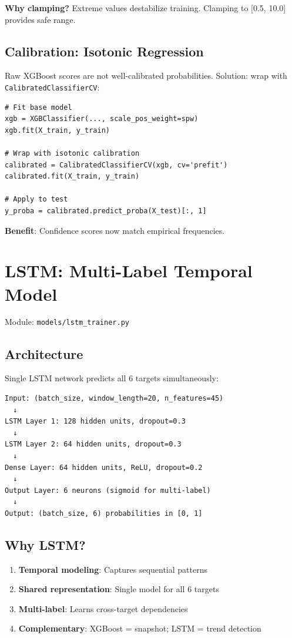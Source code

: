 \documentclass[11pt,a4paper,oneside]{report}
\begin{document}
\textbf{Why clamping?} Extreme values destabilize training. Clamping to [0.5, 10.0] provides safe range.

\subsection{Calibration: Isotonic Regression}

Raw XGBoost scores are not well-calibrated probabilities. Solution: wrap with \texttt{CalibratedClassifierCV}:

\begin{lstlisting}
# Fit base model
xgb = XGBClassifier(..., scale_pos_weight=spw)
xgb.fit(X_train, y_train)

# Wrap with isotonic calibration
calibrated = CalibratedClassifierCV(xgb, cv='prefit')
calibrated.fit(X_train, y_train)

# Apply to test
y_proba = calibrated.predict_proba(X_test)[:, 1]
\end{lstlisting}

\textbf{Benefit}: Confidence scores now match empirical frequencies.

\section{LSTM: Multi-Label Temporal Model}

Module: \texttt{models/lstm\_trainer.py}

\subsection{Architecture}

Single LSTM network predicts all 6 targets simultaneously:

\begin{verbatim}
Input: (batch_size, window_length=20, n_features=45)
  ↓
LSTM Layer 1: 128 hidden units, dropout=0.3
  ↓
LSTM Layer 2: 64 hidden units, dropout=0.3
  ↓
Dense Layer: 64 hidden units, ReLU, dropout=0.2
  ↓
Output Layer: 6 neurons (sigmoid for multi-label)
  ↓
Output: (batch_size, 6) probabilities in [0, 1]
\end{verbatim}

\subsection{Why LSTM?}

\begin{enumerate}
    \item \textbf{Temporal modeling}: Captures sequential patterns
    \item \textbf{Shared representation}: Single model for all 6 targets
    \item \textbf{Multi-label}: Learns cross-target dependencies
    \item \textbf{Complementary}: XGBoost = snapshot; LSTM = trend detection
\end{enumerate}
\end{document}
